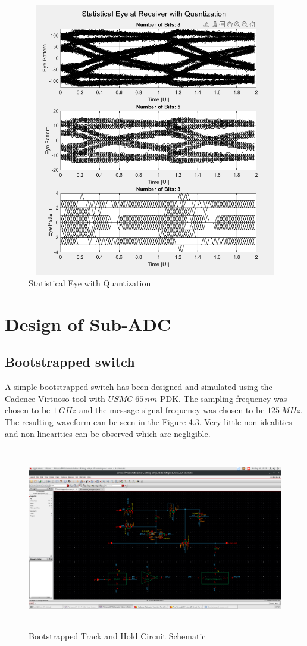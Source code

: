 \begin{figure}[h]
	\centering
	\includegraphics[width=12cm,height=12cm]{fig4_2.png}
	\caption{Statistical Eye with Quantization}
	\label{eye_w_q}
\end{figure}


\section{Design of Sub-ADC}
\label{Design of Sub-ADC}

\subsection{Bootstrapped switch}

A simple bootstrapped switch has been designed and simulated using the Cadence Virtuoso tool with $USMC\; 65\,nm$ PDK. The sampling frequency was chosen to be \textbf{$1\: GHz$} and the message signal frequency was chosen to be \textbf{$125\: MHz$}. The resulting waveform can be seen in the Figure 4.3. Very little non-idealities and non-linearities can be observed which are negligible.

\begin{figure}[h]
	\centering
	\includegraphics[width=16cm,height=8cm]{fig4_3.png}
	\caption{Bootstrapped Track and Hold Circuit Schematic}
	\label{t_h_ckt}
\end{figure}

